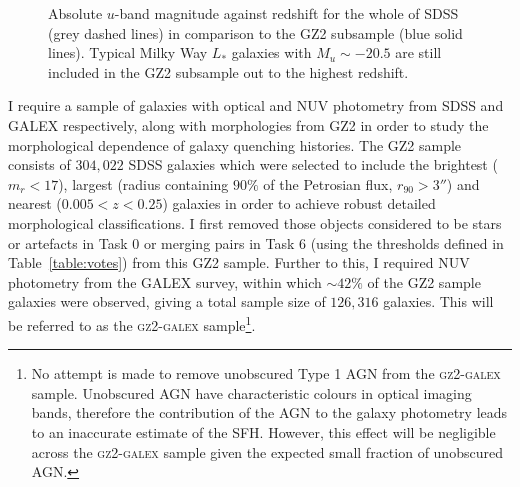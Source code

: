 \begin{figure}[t]
\caption[GZ2-GALEX sample completeness]{Absolute $u$-band magnitude against redshift for the whole of SDSS (grey dashed lines) in comparison to the GZ2 subsample (blue solid lines). Typical Milky Way $L_*$ galaxies with $M_u \sim -20.5$ are still included in the GZ2 subsample out to the highest redshift.}
\label{complete}
\end{figure}


I require a sample of galaxies with optical and NUV photometry from SDSS and GALEX respectively, along with morphologies from GZ2 in order to study the morphological dependence of galaxy quenching histories. The GZ2 sample consists of $304,022$ SDSS galaxies which were selected to include the brightest ($m_r < 17$), largest (radius containing $90\%$ of the Petrosian flux, $r_{90} > 3''$) and nearest ($0.005 < z < 0.25$) galaxies in order to achieve robust detailed morphological classifications. I first removed those objects considered to be stars or artefacts in Task 0 or merging pairs in Task 6 (using the thresholds defined in Table~\ref{table:votes}) from this GZ2 sample. Further to this, I required NUV photometry from the GALEX survey, within which $\sim42\%$ of the GZ2 sample galaxies were observed, giving a total sample size of $126, 316$ galaxies. This will be referred to as the \textsc{gz2-galex} sample\footnote{No attempt is made to remove unobscured Type 1 AGN from the \textsc{gz2-galex} sample. Unobscured AGN have characteristic colours in optical imaging bands, therefore the contribution of the AGN to the galaxy photometry leads to an inaccurate estimate of the SFH. However, this effect will be negligible across the \textsc{gz2-galex} sample given the expected small fraction of unobscured AGN.}. 

